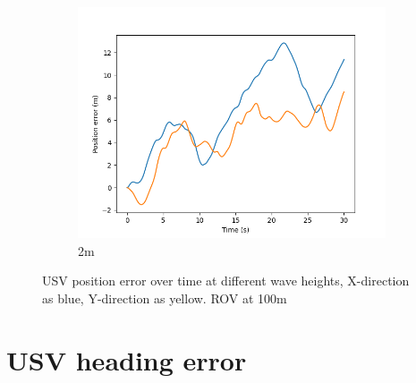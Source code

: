 \documentclass[class=article, crop=false]{standalone}
\begin{document}
\begin{figure}
\begin{subfigure}[b]{0.48\textwidth}
        \includegraphics{scenario1/rov-100m/2.0m/usv_pos_error_controlled}
        \caption{2m}
        \label{}
    \end{subfigure}
    \caption{USV position error over time at different wave heights, X-direction as blue, Y-direction as yellow. ROV at 100m}
    \label{}
\end{figure}

\section{USV heading error}
\end{document}
